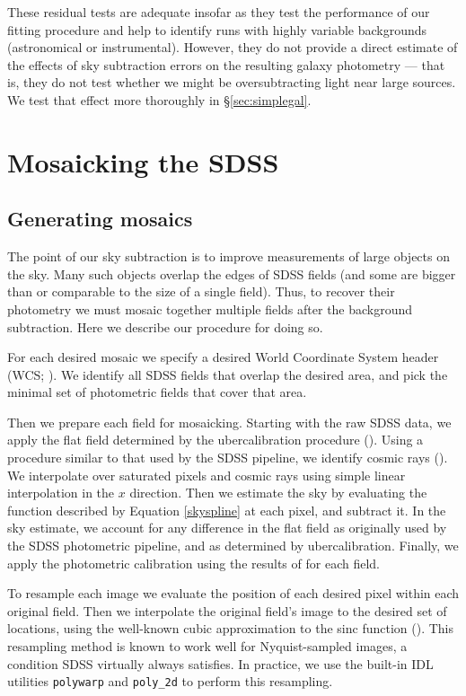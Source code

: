 \documentclass[10pt,preprint]{aastex}
\begin{document}
These residual tests are adequate insofar as they test the performance
of our fitting procedure and help to identify runs with highly
variable backgrounds (astronomical or instrumental).  However, they do
not provide a direct estimate of the effects of sky subtraction errors
on the resulting galaxy photometry --- that is, they do not test
whether we might be oversubtracting light near large sources.  We test
that effect more thoroughly in \S\ref{sec:simplegal}.

\section{Mosaicking the SDSS}
\label{sec:mosaic}

\subsection{Generating mosaics}

The point of our sky subtraction is to improve measurements of large
objects on the sky.  Many such objects overlap the edges of SDSS
fields (and some are bigger than or comparable to the size of a single
field).  Thus, to recover their photometry we must mosaic together
multiple fields after the background subtraction. Here we describe our
procedure for doing so.

For each desired mosaic we specify a desired World Coordinate System
header (WCS; \citealt{greisen02a}). We identify all SDSS fields that
overlap the desired area, and pick the minimal set of photometric
fields that cover that area.

Then we prepare each field for mosaicking.  Starting with the raw SDSS
data, we apply the flat field determined by the ubercalibration
procedure (\citealt{padmanabhan07b}). Using a procedure similar to
that used by the SDSS pipeline, we identify cosmic rays
(\citealt{lupton01a}). We interpolate over saturated pixels and cosmic
rays using simple linear interpolation in the $x$ direction.  Then we
estimate the sky by evaluating the function described by Equation
\ref{skyspline} at each pixel, and subtract it. In the sky estimate,
we account for any difference in the flat field as originally used by
the SDSS photometric pipeline, and as determined by
ubercalibration. Finally, we apply the photometric calibration using
the results of \citet{padmanabhan07b} for each field.

To resample each image we evaluate the position of each desired pixel
within each original field. Then we interpolate the original field's
image to the desired set of locations, using the well-known cubic
approximation to the sinc function (\citealt{park83a}). This
resampling method is known to work well for Nyquist-sampled images, a
condition SDSS virtually always satisfies. In practice, we use the
built-in IDL utilities {\tt polywarp} and {\tt poly\_2d} to perform
this resampling.
\end{document}
